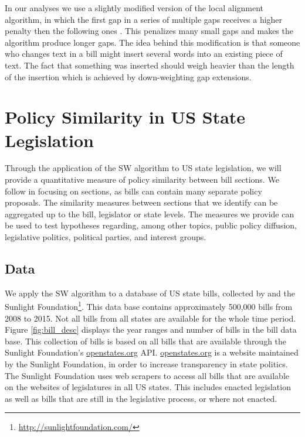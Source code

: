 \documentclass[12pt]{article} %
\begin{document}
In our analyses we use a slightly modified version of the local alignment algorithm, in which the first gap in a series of multiple gaps receives a higher penalty then the following ones \citep[][use the same modification]{wilkerson2015tracing}. This penalizes many small gaps and makes the algorithm produce longer gaps. The idea behind this modification is that someone who changes text in a bill might insert several words into an existing piece of text. The fact that something was inserted should weigh heavier than the length of the insertion which is achieved by down-weighting gap extensions. 




\section{Policy Similarity in US State Legislation}
Through the application of the SW algorithm to US state legislation, we will provide a quantitative measure of policy similarity between bill sections. We follow \citet{wilkerson2015tracing} in focusing on sections, as bills can contain many separate policy proposals. The similarity measures between sections that we identify can be aggregated up to the bill, legislator or state levels. The measures we provide can be used to test hypotheses regarding, among other topics, public policy diffusion, legislative politics, political parties, and interest groups.  

\subsection{Data}
We apply the SW algorithm to a database of US state bills, collected by
\citet{burgess2016legislative} and the Sunlight
Foundation\footnote{\url{http://sunlightfoundation.com/}}. This data base
contains approximately 500,000 bills from 2008 to 2015. Not all bills from all
states are available for the whole time period. Figure \ref{fig:bill_desc}
displays the year ranges and number of bills in the bill data base. This
collection of bills is based on all bills that are available through the
Sunlight Foundation's \url{openstates.org} API. \url{openstates.org} is a website maintained by the Sunlight Foundation, in order to increase transparency in state politics. The Sunlight Foundation uses web scrapers to access all bills that are available on the websites of legislatures in all US states. This includes enacted legislation as well as bills that are still in the legislative process, or where not enacted. %
\end{document}
